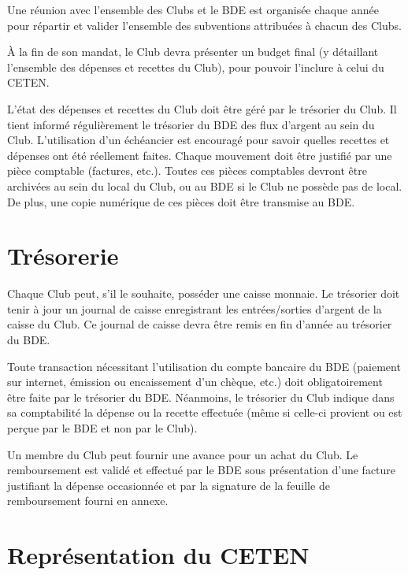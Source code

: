 \documentclass{article} %
\begin{document}
\begin{multicols}{2}
{			Une réunion avec l’ensemble des Clubs et le BDE est
			organisée chaque année pour répartir et valider l’ensemble
			des subventions attribuées à chacun des Clubs.
			
			À la fin de son mandat, le Club devra présenter un budget
			final (y détaillant l’ensemble des dépenses et recettes du
			Club), pour pouvoir l’inclure à celui du CETEN.

			L’état des dépenses et recettes du Club doit être géré par le
			trésorier du Club. Il tient informé régulièrement le trésorier
			du BDE des flux d’argent au sein du Club. L’utilisation d’un
			échéancier est encouragé pour savoir quelles recettes et
			dépenses ont été réellement faites. Chaque mouvement doit
			être justifié par une pièce comptable (factures, etc.). Toutes
			ces pièces comptables devront être archivées au sein du
			local du Club, ou au BDE si le Club ne possède pas de local.
			De plus, une copie numérique de ces pièces doit être
			transmise au BDE.

		}

		\section{Trésorerie}

		{\small

			Chaque Club peut, s’il le souhaite, posséder une caisse
			monnaie. Le trésorier doit tenir à jour un journal de caisse
			enregistrant les entrées/sorties d’argent de la caisse du
			Club. Ce journal de caisse devra être remis en fin d’année au
			trésorier du BDE.

			Toute transaction nécessitant l’utilisation du compte
			bancaire du BDE (paiement sur internet, émission ou
			encaissement d’un chèque, etc.) doit obligatoirement être
			faite par le trésorier du BDE. Néanmoins, le trésorier du Club
			indique dans sa comptabilité la dépense ou la recette
			effectuée (même si celle-ci provient ou est perçue par le BDE
			et non par le Club).

			Un membre du Club peut fournir une avance pour un achat
			du Club. Le remboursement est validé et effectué par le BDE
			sous présentation d’une facture justifiant la dépense
			occasionnée et par la signature de la feuille de
			remboursement fourni en annexe.

		}

		\section{Représentation du CETEN}


\end{multicols}
\end{document}
